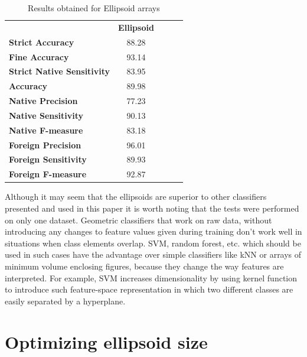 \begin{table}[htp]
	\centering
	\caption{Results obtained for Ellipsoid arrays}
	\label{ellipsoid_arrays_results}
	\begin{tabular}{l|c|lll}
		\cline{2-2}
		& \multicolumn{1}{l|}{\textbf{Ellipsoid}} &  &  &  \\ \cline{1-2}
		\multicolumn{1}{|l|}{\textbf{Strict Accuracy}}           & 88.28 \\ \cline{1-2}
		\multicolumn{1}{|l|}{\textbf{Fine Accuracy}}             & 93.14 \\ \cline{1-2}
		\multicolumn{1}{|l|}{\textbf{Strict Native Sensitivity}} & 83.95 \\ \cline{1-2}
		\multicolumn{1}{|l|}{\textbf{Accuracy}}                  & 89.98 \\ \cline{1-2}
		\multicolumn{1}{|l|}{\textbf{Native Precision}}          & 77.23 \\ \cline{1-2}
		\multicolumn{1}{|l|}{\textbf{Native Sensitivity}}        & 90.13 \\ \cline{1-2}
		\multicolumn{1}{|l|}{\textbf{Native F-measure}}          & 83.18 \\ \cline{1-2}
		\multicolumn{1}{|l|}{\textbf{Foreign Precision}}         & 96.01 \\ \cline{1-2}
		\multicolumn{1}{|l|}{\textbf{Foreign Sensitivity}}       & 89.93 \\ \cline{1-2}
		\multicolumn{1}{|l|}{\textbf{Foreign F-measure}}         & 92.87 \\ \cline{1-2}
	\end{tabular}
\end{table}

Although it may seem that the ellipsoids are superior to other classifiers presented and used in this paper it is worth noting that the tests were performed on only one dataset. Geometric classifiers that work on raw data, without introducing any changes to feature values given during training don't work well in situations when class elements overlap. SVM, random forest, etc. which should be used in such cases have the advantage over simple classifiers like kNN or arrays of minimum volume enclosing figures, because they change the way features are interpreted. For example, SVM increases dimensionality by using kernel function to introduce such feature-space representation in which two different classes are easily separated by a hyperplane.

\section{Optimizing ellipsoid size}

